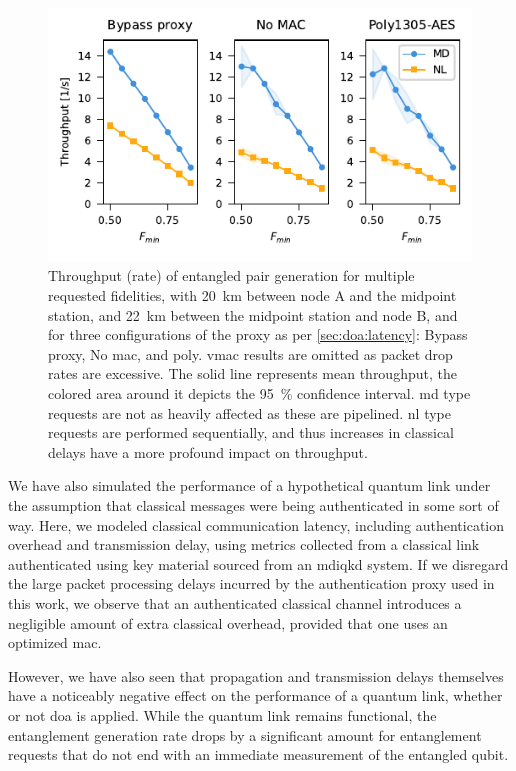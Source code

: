 \begin{figure}[t]
    \centering
    \includegraphics[width=0.6\linewidth]{figures/throughput_FCFS_mhp_150.pdf}
    \caption{
        Throughput (rate) of entangled pair generation for multiple requested fidelities, with
        \qty{20}{\km} between node A and the midpoint station, and \qty{22}{\km} between the
        midpoint station and node B, and for three configurations of the proxy as per
        \cref{sec:doa:latency}: Bypass proxy, No \acrshort{mac}, and \acrshort{poly}. \acrshort{vmac}
        results are omitted as packet drop rates are excessive. The solid line represents mean
        throughput, the colored area around it depicts the \qty{95}{\percent} confidence interval.
        \Acrfull{md} type requests are not as heavily affected as these are pipelined. \Acrfull{nl}
        type requests are performed sequentially, and thus increases in classical delays have a more
        profound impact on throughput.
    }
    \label{fig:results-fidelity}
\end{figure}

We have also simulated the performance of a hypothetical quantum link under the assumption that
classical messages were being authenticated in some sort of way. Here, we modeled classical
communication latency, including authentication overhead and transmission delay, using metrics
collected from a classical link authenticated using key material sourced from an \acrshort{mdiqkd}
system. If we disregard the large packet processing delays incurred by the authentication proxy used
in this work, we observe that an authenticated classical channel introduces a negligible amount of
extra classical overhead, provided that one uses an optimized \acrshort{mac}.

However, we have also seen that propagation and transmission delays themselves have a noticeably
negative effect on the performance of a quantum link, whether or not \acrlong{doa} is applied. While
the quantum link remains functional, the entanglement generation rate drops by a significant amount
for entanglement requests that do not end with an immediate measurement of the entangled qubit.

\printbibliography[heading=subbibintoc,title={References},notcategory=noprint]
